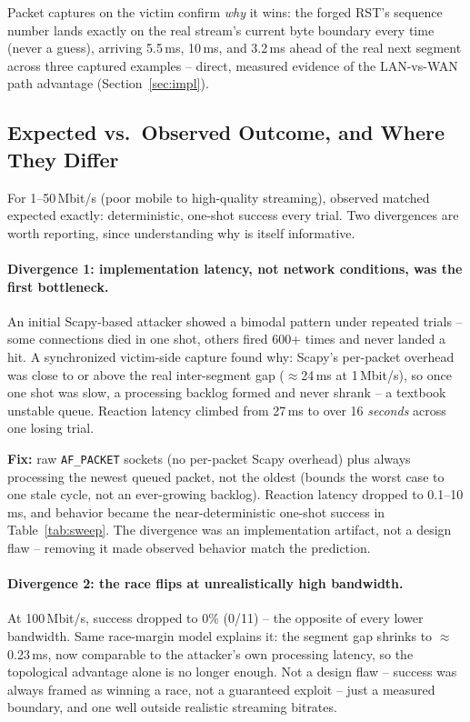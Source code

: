 \documentclass[11pt]{article}
\begin{document}
Packet captures on the victim confirm \emph{why} it wins: the forged
RST's sequence number lands exactly on the real stream's current byte
boundary every time (never a guess), arriving 5.5\,ms, 10\,ms, and
3.2\,ms ahead of the real next segment across three captured examples --
direct, measured evidence of the LAN-vs-WAN path advantage
(Section~\ref{sec:impl}).

\subsection{Expected vs.\ Observed Outcome, and Where They Differ}
\label{sec:diverge}

For 1--50\,Mbit/s (poor mobile to high-quality streaming), observed
matched expected exactly: deterministic, one-shot success every trial.
Two divergences are worth reporting, since understanding why is itself
informative.

\paragraph{Divergence 1: implementation latency, not network
conditions, was the first bottleneck.}
\label{sec:latency}
An initial Scapy-based attacker showed a bimodal pattern under repeated
trials -- some connections died in one shot, others fired 600+ times
and never landed a hit. A synchronized victim-side capture found why:
Scapy's per-packet overhead was close to or above the real
inter-segment gap ($\approx$24\,ms at 1\,Mbit/s), so once one shot was
slow, a processing backlog formed and never shrank -- a textbook
unstable queue. Reaction latency climbed from 27\,ms to over 16
\emph{seconds} across one losing trial.

\textbf{Fix:} raw \texttt{AF\_PACKET} sockets (no per-packet Scapy
overhead) plus always processing the newest queued packet, not the
oldest (bounds the worst case to one stale cycle, not an ever-growing
backlog). Reaction latency dropped to 0.1--10\,ms, and behavior became
the near-deterministic one-shot success in Table~\ref{tab:sweep}. The
divergence was an implementation artifact, not a design flaw --
removing it made observed behavior match the prediction.

\paragraph{Divergence 2: the race flips at unrealistically high
bandwidth.} At 100\,Mbit/s, success dropped to 0\% (0/11) -- the
opposite of every lower bandwidth. Same race-margin model explains it:
the segment gap shrinks to $\approx$0.23\,ms, now comparable to the
attacker's own processing latency, so the topological advantage alone
is no longer enough. Not a design flaw -- success was always framed as
winning a race, not a guaranteed exploit -- just a measured boundary,
and one well outside realistic streaming bitrates.
\end{document}
